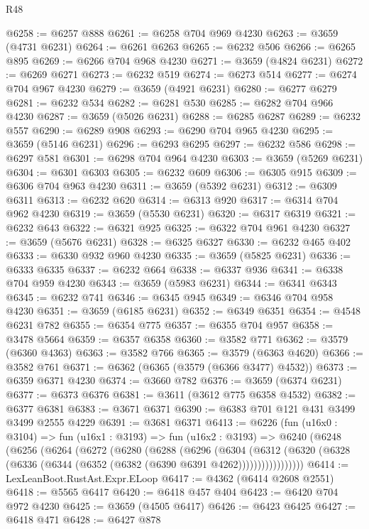 \begin{lexlean}{R48}
\begin{coremodule}
@6258 := @6257 @888
@6261 := @6258 @704 @969 @4230
@6263 := @3659 (@4731 @6231)
@6264 := @6261 @6263
@6265 := @6232 @506
@6266 := @6265 @895
@6269 := @6266 @704 @968 @4230
@6271 := @3659 (@4824 @6231)
@6272 := @6269 @6271
@6273 := @6232 @519
@6274 := @6273 @514
@6277 := @6274 @704 @967 @4230
@6279 := @3659 (@4921 @6231)
@6280 := @6277 @6279
@6281 := @6232 @534
@6282 := @6281 @530
@6285 := @6282 @704 @966 @4230
@6287 := @3659 (@5026 @6231)
@6288 := @6285 @6287
@6289 := @6232 @557
@6290 := @6289 @908
@6293 := @6290 @704 @965 @4230
@6295 := @3659 (@5146 @6231)
@6296 := @6293 @6295
@6297 := @6232 @586
@6298 := @6297 @581
@6301 := @6298 @704 @964 @4230
@6303 := @3659 (@5269 @6231)
@6304 := @6301 @6303
@6305 := @6232 @609
@6306 := @6305 @915
@6309 := @6306 @704 @963 @4230
@6311 := @3659 (@5392 @6231)
@6312 := @6309 @6311
@6313 := @6232 @620
@6314 := @6313 @920
@6317 := @6314 @704 @962 @4230
@6319 := @3659 (@5530 @6231)
@6320 := @6317 @6319
@6321 := @6232 @643
@6322 := @6321 @925
@6325 := @6322 @704 @961 @4230
@6327 := @3659 (@5676 @6231)
@6328 := @6325 @6327
@6330 := @6232 @465 @402
@6333 := @6330 @932 @960 @4230
@6335 := @3659 (@5825 @6231)
@6336 := @6333 @6335
@6337 := @6232 @664
@6338 := @6337 @936
@6341 := @6338 @704 @959 @4230
@6343 := @3659 (@5983 @6231)
@6344 := @6341 @6343
@6345 := @6232 @741
@6346 := @6345 @945
@6349 := @6346 @704 @958 @4230
@6351 := @3659 (@6185 @6231)
@6352 := @6349 @6351
@6354 := @4548 @6231 @782
@6355 := @6354 @775
@6357 := @6355 @704 @957
@6358 := @3478 @5664
@6359 := @6357 @6358
@6360 := @3582 @771
@6362 := @3579 (@6360 @4363)
@6363 := @3582 @766
@6365 := @3579 (@6363 @4620)
@6366 := @3582 @761
@6371 := @6362 (@6365 (@3579 (@6366 @3477) @4532))
@6373 := @6359 @6371 @4230
@6374 := @3660 @782
@6376 := @3659 (@6374 @6231)
@6377 := @6373 @6376
@6381 := @3611 (@3612 @775 @6358 @4532)
@6382 := @6377 @6381
@6383 := @3671 @6371
@6390 := @6383 @701 @121 @431 @3499 @3499 @2555 @4229
@6391 := @3681 @6371
@6413 := @6226
    (fun (u16x0 : @3104) =>
    fun (u16x1 : @3193) =>
    fun (u16x2 : @3193) =>
    @6240
      (@6248
        (@6256
          (@6264
            (@6272
              (@6280
                (@6288
                  (@6296
                    (@6304
                      (@6312
                        (@6320
                          (@6328 (@6336 (@6344 (@6352 (@6382 (@6390 @6391 @4262)))))))))))))))))
@6414 := LexLeanBoot.RustAst.Expr.ELoop
@6417 := @4362 (@6414 @2608 @2551)
@6418 := @5565 @6417
@6420 := @6418 @457 @404
@6423 := @6420 @704 @972 @4230
@6425 := @3659 (@4505 @6417)
@6426 := @6423 @6425
@6427 := @6418 @471
@6428 := @6427 @878

\end{coremodule}
\end{lexlean}
